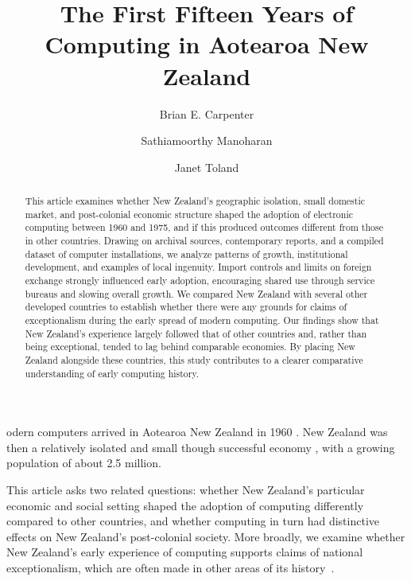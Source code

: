\documentclass{IEEEcsmag}
\begin{document}

\title{The First Fifteen Years of Computing in Aotearoa New Zealand}

\author{Brian E. Carpenter}

\author{Sathiamoorthy Manoharan}

\author{Janet Toland}




\begin{abstract}This article examines whether New Zealand's geographic isolation, small domestic market, and post-colonial economic structure shaped the adoption of electronic computing between 1960 and 1975, and if this produced outcomes different from those in other countries. Drawing on archival sources, contemporary reports, and a compiled dataset of computer installations, we analyze patterns of growth, institutional development, and examples of local ingenuity.
Import controls and limits on foreign exchange strongly influenced early adoption, encouraging shared use through service bureaus and slowing overall growth.
We compared New Zealand with several other developed countries to establish whether there were any grounds for claims of exceptionalism during the early spread of modern computing. Our findings show that New Zealand's experience largely followed that of other countries and, rather than being exceptional, tended to lag behind comparable economies. By placing New Zealand alongside these countries, this study contributes to a clearer comparative understanding of early computing history.

\end{abstract}


\maketitle


odern computers arrived in Aotearoa New Zealand in 1960 \cite{FirstCinNZ}. 
New Zealand was then a relatively isolated and small though successful economy \cite{Easton-2020},
with a growing population of about 2.5 million.

This article asks two related questions: whether New Zealand's particular economic and
social setting shaped the adoption of computing differently compared to other countries,
and whether computing in turn had distinctive effects on New Zealand's post-colonial society.
More broadly, we examine whether New Zealand's early experience of computing supports
claims of national exceptionalism, which are
often made in other areas of its history~\cite{Frykberg-2025}.
\end{document}
